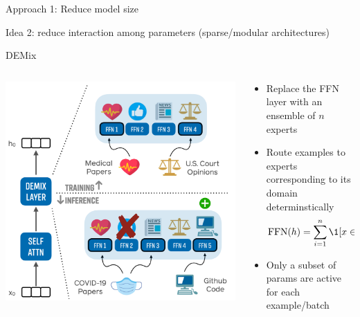 \documentclass[usenames,dvipsnames,notes,11pt,aspectratio=169,hyperref={colorlinks=true, linkcolor=blue}]{beamer}
\begin{document}
\begin{frame}
    {Approach 1: Reduce model size}

    Idea 2: reduce interaction among parameters (sparse/modular architectures)

    DEMix 

    \begin{columns}
        \begin{column}{0.4\textwidth}
            \includegraphics[height=0.6\textheight]{figures/demix}
        \end{column}
        \begin{column}{0.6\textwidth}
            \begin{itemize}
                \item Replace the FFN layer with an ensemble of $n$ experts
                \item Route examples to experts corresponding to its domain determinstically
                    $$
                    \mathrm{FFN}(h) = \sum_{i=1}^n \1{[x \in \text{domain $i$}]} \mathrm{FFN}_i(x)
                    $$
                \item Only a subset of params are active for each example/batch
            \end{itemize}
        \end{column}
    \end{columns}
\end{frame}
\end{document}
